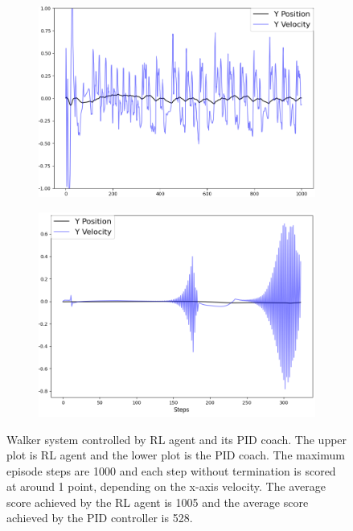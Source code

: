 \documentclass[journal]{IEEEtran}
\begin{document}
\begin{figure}
\centering
\begin{subfigure}{0.3\textwidth}
  \centering
  \includegraphics[width=\linewidth]{walker_RL.png}
\end{subfigure}
\hfill
\begin{subfigure}{.3\textwidth}
  \centering
  \includegraphics[width=\linewidth]{walker_PID.png}
\end{subfigure}
\caption{Walker system controlled by RL agent and its PID coach. The upper plot is RL agent and the lower plot is the PID coach. The maximum episode steps are 1000 and each step without termination is scored at around 1 point, depending on the x-axis velocity. The average score achieved by the RL agent is 1005 and the average score achieved by the PID controller is 528.}
\label{fig:walker}
\end{figure}
\end{document}

